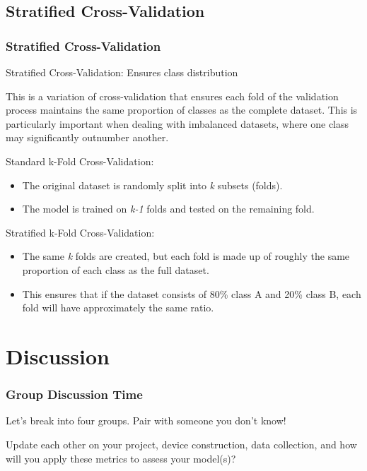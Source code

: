 \documentclass[aspectratio=169]{beamer} %
\begin{document}
	\subsection{Stratified Cross-Validation}
	\begin{frame}
		\frametitle{Stratified Cross-Validation}
		Stratified Cross-Validation: Ensures class distribution

		This is a variation of cross-validation that ensures each fold of the validation process maintains the same proportion of classes as the complete dataset. This is particularly important when dealing with imbalanced datasets, where one class may significantly outnumber another.

    	Standard k-Fold Cross-Validation:
    	\begin{itemize}
        	\item The original dataset is randomly split into {\em k} subsets (folds).
        	\item The model is trained on {\em k-1} folds and tested on the remaining fold.
        \end{itemize}
    	
    	Stratified k-Fold Cross-Validation:
    	\begin{itemize}
        	\item The same {\em k} folds are created, but each fold is made up of roughly the same proportion of each class as the full dataset.
        	\item This ensures that if the dataset consists of 80\% class A and 20\% class B, each fold will have approximately the same ratio.
        \end{itemize}
	\end{frame}

\section{Discussion}
	\begin{frame}
		\frametitle{Group Discussion Time}
		Let's break into four groups.  Pair with someone you don't know!

		Update each other on your project, device construction, data collection, and how will you apply these metrics to assess your model(s)?
	\end{frame}
\end{document}
